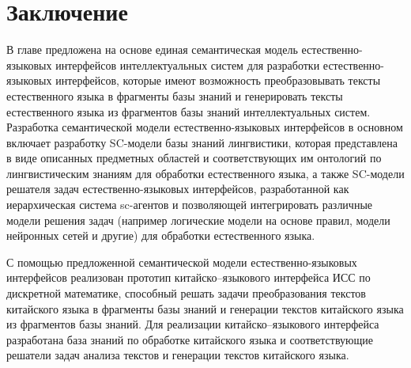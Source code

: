 \section*{Заключение}
В главе предложена на основе  единая семантическая модель естественно-языковых интерфейсов интеллектуальных систем для разработки естественно-языковых интерфейсов, которые имеют возможность преобразовывать тексты естественного языка в фрагменты базы знаний и генерировать тексты естественного языка из фрагментов базы знаний интеллектуальных систем. Разработка семантической модели естественно-языковых интерфейсов в основном включает разработку SC-модели базы знаний лингвистики, которая представлена в виде описанных предметных областей и соответствующих им онтологий по лингвистическим знаниям для обработки естественного языка, а также SC-модели решателя задач естественно-языковых интерфейсов, разработанной как иерархическая система sc-агентов и позволяющей интегрировать различные модели решения задач (например логические модели на основе правил, модели нейронных сетей и другие) для обработки естественного языка.

С помощью предложенной семантической модели естественно-языковых интерфейсов реализован прототип китайско–языкового интерфейса ИСС по дискретной математике, способный решать задачи преобразования текстов китайского языка в фрагменты базы знаний и генерации текстов китайского языка из фрагментов базы знаний. Для реализации китайско–языкового интерфейса разработана база знаний по обработке китайского языка и соответствующие решатели задач анализа текстов и генерации текстов китайского языка.
%